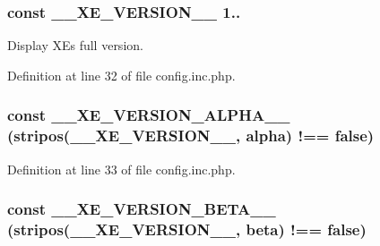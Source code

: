 \subsubsection[{\+\_\+\+\_\+\+X\+E\+\_\+\+V\+E\+R\+S\+I\+O\+N\+\_\+\+\_\+}]{\setlength{\rightskip}{0pt plus 5cm}const \+\_\+\+\_\+\+X\+E\+\_\+\+V\+E\+R\+S\+I\+O\+N\+\_\+\+\_\+ \textquotesingle{}1..\textquotesingle{}}\label{config_8inc_8php_afceaaec30d0e5b6a78d0ae28bcbfc8f3}
Display X\+E\textquotesingle{}s full version. 

Definition at line 32 of file config.\+inc.\+php.

\hypertarget{config_8inc_8php_aaee982ed748e379cde978edfe8d433e1}{}
\subsubsection[{\+\_\+\+\_\+\+X\+E\+\_\+\+V\+E\+R\+S\+I\+O\+N\+\_\+\+A\+L\+P\+H\+A\+\_\+\+\_\+}]{\setlength{\rightskip}{0pt plus 5cm}const \+\_\+\+\_\+\+X\+E\+\_\+\+V\+E\+R\+S\+I\+O\+N\+\_\+\+A\+L\+P\+H\+A\+\_\+\+\_\+ (stripos({\bf \+\_\+\+\_\+\+X\+E\+\_\+\+V\+E\+R\+S\+I\+O\+N\+\_\+\+\_\+}, \textquotesingle{}alpha\textquotesingle{}) !== false)}\label{config_8inc_8php_aaee982ed748e379cde978edfe8d433e1}


Definition at line 33 of file config.\+inc.\+php.

\hypertarget{config_8inc_8php_aac8a83557f3eab1d2d2583fe21559ca9}{}
\subsubsection[{\+\_\+\+\_\+\+X\+E\+\_\+\+V\+E\+R\+S\+I\+O\+N\+\_\+\+B\+E\+T\+A\+\_\+\+\_\+}]{\setlength{\rightskip}{0pt plus 5cm}const \+\_\+\+\_\+\+X\+E\+\_\+\+V\+E\+R\+S\+I\+O\+N\+\_\+\+B\+E\+T\+A\+\_\+\+\_\+ (stripos({\bf \+\_\+\+\_\+\+X\+E\+\_\+\+V\+E\+R\+S\+I\+O\+N\+\_\+\+\_\+}, \textquotesingle{}beta\textquotesingle{}) !== false)}\label{config_8inc_8php_aac8a83557f3eab1d2d2583fe21559ca9}


